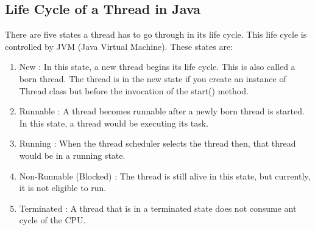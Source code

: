\documentclass[11pt]{article}
\begin{document}
\subsection{Life Cycle of a Thread in Java}
There are five states a thread has to go through in its life cycle. This life cycle is controlled by JVM (Java Virtual Machine). These states are:
\begin{enumerate}
	\item New : In this state, a new thread begins its life cycle. This is also called a born thread. The thread is in the new state if you create an instance of Thread class but before the invocation of the start() method.
	\item Runnable : A thread becomes runnable after a newly born thread is started. In this state, a thread would be executing its task.
	\item Running : When the thread scheduler selects the thread then, that thread would be in a running state.
	\item Non-Runnable (Blocked) : The thread is still alive in this state, but currently, it is not eligible to run.
	\item Terminated : A thread that is in a terminated state does not consume ant cycle of the CPU.
\end{enumerate}
\end{document}
